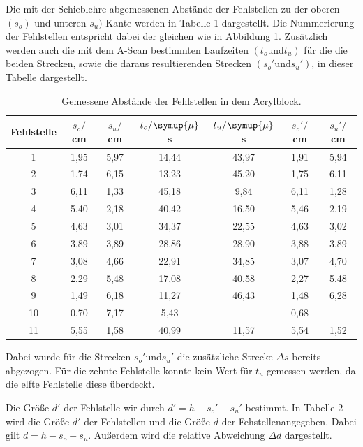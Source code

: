 Die mit der Schieblehre abgemessenen Abstände der Fehlstellen zu der oberen $(s_o)$ und unteren $s_u)$ Kante werden in Tabelle 1 dargestellt. Die Nummerierung der
Fehlstellen entspricht dabei der gleichen wie in Abbildung 1. Zusätzlich werden auch die mit dem A-Scan bestimmten Laufzeiten $(t_o \text{und} t_u)$ für die
die beiden Strecken, sowie die daraus resultierenden Strecken $(s_o' \text{und} s_u')$, in dieser Tabelle dargestellt.
\begin{table}[H]
  \centering
  \caption{Gemessene Abstände der Fehlstellen in dem Acrylblock.}
  \label{tab:spannung1}
  \begin{tabular}{c c c c c c c}
    \toprule
  Fehlstelle & $s_o/$cm & $s_u/$cm & $t_o/\symup{\mu}$s & $t_u/\symup{\mu}$s & $s_o'/$cm & $s_u'/$cm  \\
    \midrule
    1  &  1,95 & 5,97 & 14,44 & 43,97 & 1,91 & 5,94    \\
    2  &  1,74 & 6,15 & 13,23 & 45,20 & 1,75 & 6,11    \\
    3  &  6,11 & 1,33 & 45,18 & 9,84  & 6,11 & 1,28    \\
    4  &  5,40 & 2,18 & 40,42 & 16,50 & 5,46 & 2,19    \\
    5  &  4,63 & 3,01 & 34,37 & 22,55 & 4,63 & 3,02    \\
    6  &  3,89 & 3,89 & 28,86 & 28,90 & 3,88 & 3,89    \\
    7  &  3,08 & 4,66 & 22,91 & 34,85 & 3,07 & 4,70    \\
    8  &  2,29 & 5,48 & 17,08 & 40,58 & 2,27 & 5,48    \\
    9  &  1,49 & 6,18 & 11,27 & 46,43 & 1,48 & 6,28    \\
    10 &  0,70 & 7,17 & 5,43  & -     & 0,68 & -     \\
    11 &  5,55 & 1,58 & 40,99 & 11,57 & 5,54 & 1,52    \\
    \bottomrule
  \end{tabular}
\end{table}

Dabei wurde für die Strecken $s_o' \text{und} s_u'$ die zusätzliche Strecke $\Delta s$ bereits abgezogen. Für die zehnte Fehlstelle konnte
kein Wert für $t_u$ gemessen werden, da die elfte Fehlstelle diese überdeckt.

Die Größe $d'$ der Fehlstelle wir durch $d' = h - s_o' - s_u'$ bestimmt. In Tabelle 2 wird die Größe $d'$ der Fehlstellen und die
Größe $d$ der Fehstellenangegeben. Dabei gilt $d = h - s_o - s_u$. Außerdem wird die relative Abweichung $\Delta d$ dargestellt.

